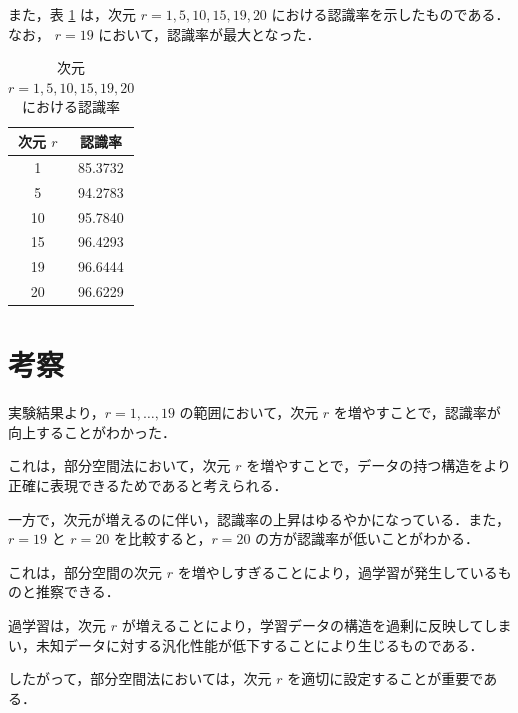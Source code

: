 \documentclass[fleqn, a4paper. 12pt]{jsarticle}
\begin{document}
    \quad

    また，表 \ref{tab:1} は，次元 $r = 1, 5, 10, 15, 19, 20$ における認識率を示したものである．
    なお， $r = 19$ において，認識率が最大となった．

    \begin{table}[p]
      \centering
      \caption{次元 $r = 1, 5, 10, 15, 19, 20$ における認識率}
      \begin{tabular}{|c|c|}
        \hline
        次元 $r$ & 認識率 \\
        \hline
        1 & 85.3732 \\
        5 & 94.2783 \\
        10 & 95.7840 \\
        15 & 96.4293 \\
        19 & 96.6444 \\
        20 & 96.6229 \\
        \hline
      \end{tabular}
      \label{tab:1}
    \end{table}

  \section{考察}

    実験結果より，$r = 1, \dots, 19$ の範囲において，次元 $r$ を増やすことで，認識率が向上することがわかった．

    これは，部分空間法において，次元 $r$ を増やすことで，データの持つ構造をより正確に表現できるためであると考えられる．

    一方で，次元が増えるのに伴い，認識率の上昇はゆるやかになっている．また，$r = 19$ と $r = 20$ を比較すると，$r = 20$ の方が認識率が低いことがわかる．

    これは，部分空間の次元 $r$ を増やしすぎることにより，過学習が発生しているものと推察できる．

    過学習は，次元 $r$ が増えることにより，学習データの構造を過剰に反映してしまい，未知データに対する汎化性能が低下することにより生じるものである．

    したがって，部分空間法においては，次元 $r$ を適切に設定することが重要である．
\end{document}
